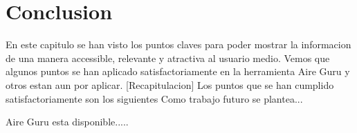 \section{Conclusion}
En este capitulo se han visto los puntos claves para poder mostrar la informacion de una manera accessible,
relevante y atractiva al usuario medio. Vemos que algunos puntos se han aplicado satisfactoriamente en la herramienta
Aire Guru y otros estan aun por aplicar.
[Recapitulacion]
Los puntos que se han cumplido satisfactoriamente son los siguientes
Como trabajo futuro se plantea...

Aire Guru esta disponible.....